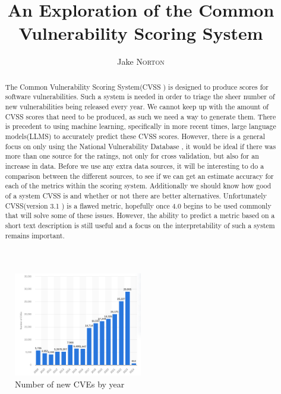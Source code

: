 \documentclass[12pt]{article}
\title{An Exploration of the Common Vulnerability Scoring System}
\author{Jake \textsc{Norton}}
\begin{document}
\maketitle

\begin{abstract}

	The Common Vulnerability Scoring System(CVSS \cite{CVSS}) is designed to produce scores for
	software vulnerabilities. Such a system is needed in order to triage the sheer number of new
	vulnerabilities being released every year. We cannot keep up with the amount of CVSS scores that
	need to be produced, as such we need a way to generate them. There is precedent to using machine
	learning, specifically in more recent times, large language models(LLMS) to accurately predict
	these CVSS scores. \cite{costa} However, there is a general focus on only using the National
	Vulnerability Database \cite{costa} \cite{nvd_example1} \cite{nvd_example2}, it would be ideal if
	there was more than one source for the ratings, not only for cross validation, but also for an
	increase in data. Before we use any extra data sources, it will be interesting to do a
	comparison between the different sources, to see if we can get an estimate accuracy for each of
	the metrics within the scoring system. Additionally we should know how good of a system CVSS is
	and whether or not there are better alternatives. Unfortunately CVSS(version 3.1 \cite{CVSS_31}) is a flawed
	metric, hopefully once 4.0 begins to be used commonly that will solve some of these issues.
	However, the ability to predict a metric based on a short text description is still useful and a
	focus on the interpretability of such a system remains important.

\end{abstract}

\begin{figure}
	\centering
	\includegraphics[width=0.5\textwidth]{figures/cve_year.png}
	\caption{\label{fig:cve_year}Number of new CVEs by year}
\end{figure}
\end{document}
